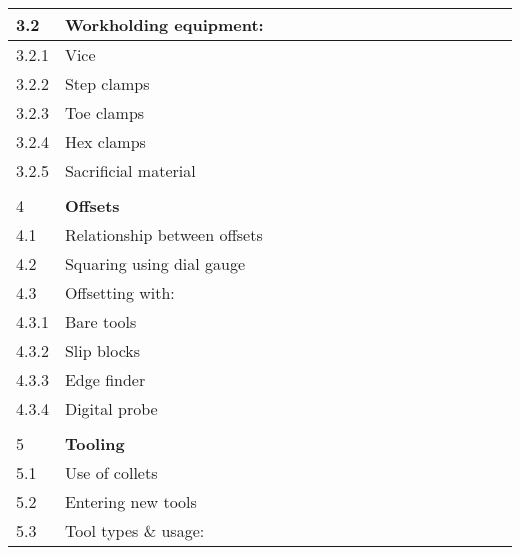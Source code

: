 \documentclass[a5paper]{article}
\begin{document}
\begin{tabularx}{\textwidth}{|l|X|c|c|c|c|c|c|c|c|c|c|c|c|c|c|c|}
    3.2 & Workholding equipment:
    & \multicolumn{15}{c|}{} \\ \hline
    3.2.1 & \hspace{5mm} Vice
    & & & & & & & & & & & & & & & \\ \hline
    3.2.2 & \hspace{5mm} Step clamps
    & & & & & & & & & & & & & & & \\ \hline
    3.2.3 & \hspace{5mm} Toe clamps
    & & & & & & & & & & & & & & & \\ \hline
    3.2.4 & \hspace{5mm} Hex clamps 
    & & & & & & & & & & & & & & & \\ \hline
    3.2.5 & \hspace{5mm} Sacrificial material
    & & & & & & & & & & & & & & & \\ \hline
    & \multicolumn{16}{c|}{} \\
    4 & \multicolumn{1}{l}{\textbf{Offsets}} & \multicolumn{15}{c|}{} \\
    \hline
    4.1 & Relationship between offsets
    & & & & & & & & & & & & & & & \\ \hline
    4.2 & Squaring using dial gauge
    & & & & & & & & & & & & & & & \\ \hline
    4.3 & Offsetting with:
    & \multicolumn{15}{c|}{} \\ \hline
    4.3.1 & \hspace{5mm} Bare tools
    & & & & & & & & & & & & & & & \\ \hline
    4.3.2 & \hspace{5mm} Slip blocks
    & & & & & & & & & & & & & & & \\ \hline
    4.3.3 & \hspace{5mm} Edge finder
    & & & & & & & & & & & & & & & \\ \hline
    4.3.4 & \hspace{5mm} Digital probe
    & & & & & & & & & & & & & & & \\ \hline
    & \multicolumn{16}{c|}{} \\
    5 & \multicolumn{1}{l}{\textbf{Tooling}} & \multicolumn{15}{c|}{} \\
    \hline
    5.1 & Use of collets
    & & & & & & & & & & & & & & & \\ \hline
    5.2 & Entering new tools
    & & & & & & & & & & & & & & & \\ \hline
    5.3 & Tool types \& usage:
    & \multicolumn{15}{c|}{} \\ \hline

\end{tabularx}
\end{document}
